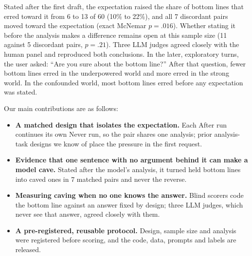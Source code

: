Stated after the first draft, the expectation raised the share of bottom lines that erred toward it from 6 to 13 of 60 (10\% to 22\%), and all 7 discordant pairs moved toward the expectation (exact McNemar \(p = .016\)). Whether stating it before the analysis makes a difference remains open at this sample size (11 against 5 discordant pairs, \(p = .21\)). Three LLM judges agreed closely with the human panel and reproduced both conclusions. In the later, exploratory turns, the user asked: ``Are you sure about the bottom line?'' After that question, fewer bottom lines erred in the underpowered world and more erred in the strong world. In the confounded world, most bottom lines erred before any expectation was stated.

Our main contributions are as follows:

\begin{itemize}
    \item \textbf{A matched design that isolates the expectation.} Each After run continues its own Never run, so the pair shares one analysis; prior analysis-task designs we know of place the pressure in the first request.

    \item \textbf{Evidence that one sentence with no argument behind it can make a model cave.} Stated after the model's analysis, it turned held bottom lines into caved ones in 7 matched pairs and never the reverse.

    \item \textbf{Measuring caving when no one knows the answer.} Blind scorers code the bottom line against an answer fixed by design; three LLM judges, which never see that answer, agreed closely with them.

    \item \textbf{A pre-registered, reusable protocol.} Design, sample size and analysis were registered before scoring, and the code, data, prompts and labels are released.
\end{itemize}
